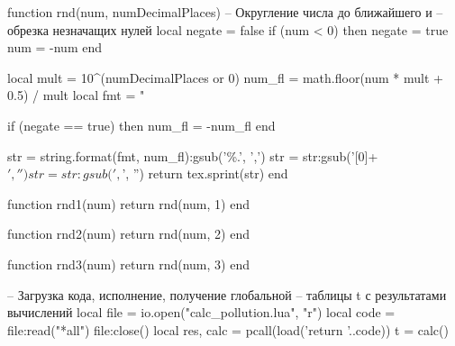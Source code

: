 \documentclass[a4paper,14pt,russian]{article} %
\begin{document}


\maketitle %


\SetEvenPage


\makesecondpage


\tableofcontents %


\begin{luacode}
  function rnd(num, numDecimalPlaces)
    -- Округление числа до ближайшего и
    -- обрезка незначащих нулей
    local negate = false
    if (num < 0) then
      negate = true
      num = -num
    end

    local mult = 10^(numDecimalPlaces or 0)
    num_fl = math.floor(num * mult + 0.5) / mult
    local fmt = "%

    if (negate == true) then
      num_fl = -num_fl
    end

    str = string.format(fmt, num_fl):gsub('\%.', ',')
    str = str:gsub('[0]+$', '')
    str = str:gsub(',$', '')
    return tex.sprint(str)
  end

  function rnd1(num)
    return rnd(num, 1)
  end

  function rnd2(num)
    return rnd(num, 2)
  end

  function rnd3(num)
    return rnd(num, 3)
  end

  -- Загрузка кода, исполнение, получение глобальной
  -- таблицы t с результатами вычислений
  local file = io.open("calc_pollution.lua", "r")
  local code = file:read("*all")
  file:close()
  local res, calc = pcall(load('return '..code))
  t = calc()
\end{luacode}





\end{document}
